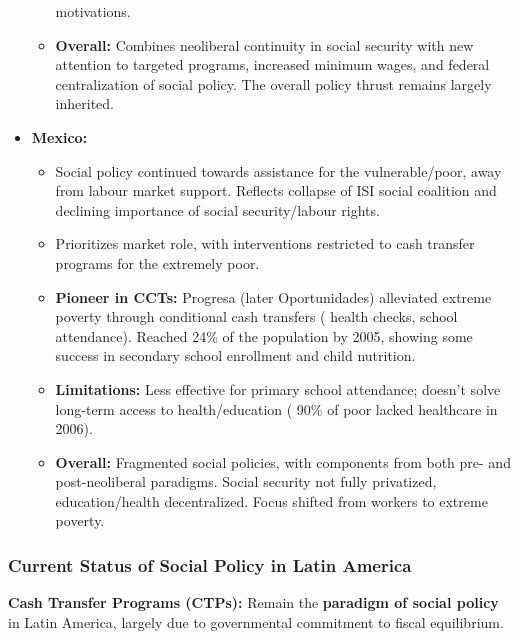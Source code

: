 \documentclass{article}
\begin{document}
\begin{itemize}
\begin{itemize}
            motivations.
            \item \textbf{Overall:} Combines neoliberal continuity in social
            security with new attention to targeted programs, increased
            minimum wages, and federal centralization of social policy. The
            overall policy thrust remains largely inherited.
        \end{itemize}
        \item \textbf{Mexico:}
        \begin{itemize}
            \item Social policy continued towards assistance for the
            vulnerable/poor, away from labour market support. Reflects
            collapse of ISI social coalition and declining importance of
            social security/labour rights.
            \item Prioritizes market role, with interventions restricted to
            cash transfer programs for the extremely poor.
            \item \textbf{Pioneer in CCTs:} Progresa (later Oportunidades)
            alleviated extreme poverty through conditional cash transfers (
            health checks, school attendance). Reached 24\% of the
            population by 2005, showing some success in secondary school
            enrollment and child nutrition.
            \item \textbf{Limitations:} Less effective for primary school
            attendance; doesn't solve long-term access to health/education (
            90\% of poor lacked healthcare in 2006).
            \item \textbf{Overall:} Fragmented social policies, with
            components from both pre- and post-neoliberal paradigms. Social
            security not fully privatized, education/health decentralized.
            Focus shifted from workers to extreme poverty.
        \end{itemize}
    \end{itemize}

    \subsubsection{Current Status of Social Policy in Latin America}

    \noindent \textbf{Cash Transfer Programs (CTPs):} Remain the
\textbf{paradigm of social policy} in Latin America, largely due to
governmental commitment to fiscal equilibrium.\\
\end{document}
